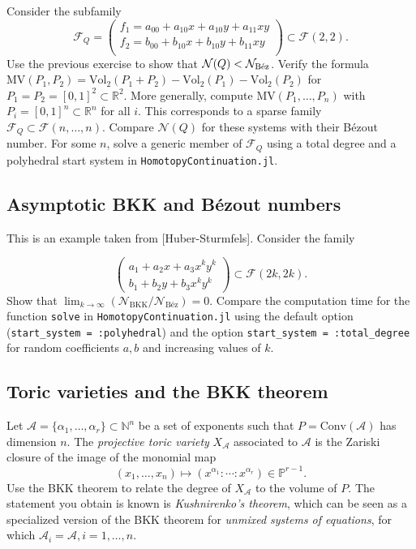 \documentclass[11pt,reqno]{amsart}
\theoremstyle{definition}
\theoremstyle{remark}
\numberwithin{equation}{section}
\begin{document}
Consider the subfamily 
$$ \mathcal{F}_Q = \begin{pmatrix}
f_1 = a_{00} + a_{10}x + a_{10}y + a_{11}xy \\
f_2 = b_{00} + b_{10}x + b_{10}y + b_{11}xy \\
\end{pmatrix} \subset \mathcal{F}(2,2).$$
Use the previous exercise to show that $\mathcal{N}(Q) < \mathcal{N}_{\textup{B\'ez}}$. Verify the formula $\text{MV}(P_1,P_2) = \text{Vol}_2(P_1 + P_2) - \text{Vol}_2(P_1) - \text{Vol}_2(P_2)$ for $P_1 = P_2 = [0,1]^2 \subset \mathbb{R}^2$. More generally, compute $\text{MV}(P_1, \ldots, P_n)$ with $P_i = [0,1]^n \subset \mathbb{R}^n$ for all $i$. This corresponds to a sparse family $\mathcal{F}_Q \subset \mathcal{F}(n,\ldots, n)$. Compare $\mathcal{N}(Q)$ for these systems with their B\'ezout number. For some $n$, solve a generic member of $\mathcal{F}_Q$ using a total degree and a polyhedral start system in \texttt{HomotopyContinuation.jl}.

\subsection{Asymptotic BKK and B\'ezout numbers}
This is an example taken from [Huber-Sturmfels]. Consider the family 

$$\begin{pmatrix}
a_1 +  a_2 x + a_3 x^ky^k \\
b_1 + b_2 y + b_3 x^ky^k 
\end{pmatrix} \subset \mathcal{F}(2k,2k).$$
Show that $\lim_{k \rightarrow \infty} ( \mathcal{N}_{\text{BKK}} / \mathcal{N}_{\text{Béz}} ) = 0$. Compare the computation time for the function \texttt{solve} in \texttt{HomotopyContinuation.jl} using the default option (\texttt{start\_system = :polyhedral}) and the option \texttt{start\_system = :total\_degree} for random coefficients $a, b$ and increasing values of $k$. 

\subsection{Toric varieties and the BKK theorem}

Let $\mathcal{A} = \{ \alpha_1, \ldots, \alpha_r \} \subset \mathbb{N}^n$ be a set of exponents such that $P = \text{Conv}(\mathcal{A})$ has dimension $n$. The \emph{projective toric variety} $X_\mathcal{A}$ associated to $\mathcal{A}$ is the Zariski closure of the image of the monomial map
$$ (x_1, \ldots, x_n) \mapsto (x^{\alpha_1} : \cdots : x^{\alpha_r}) \in \mathbb{P}^{r-1}.$$
Use the BKK theorem to relate the degree of $X_\mathcal{A}$ to the volume of $P$. The statement you obtain is known is \emph{Kushnirenko's theorem}, which can be seen as a specialized version of the BKK theorem for \emph{unmixed systems of equations}, for which $\mathcal{A}_i = \mathcal{A}, i = 1, \ldots, n$.
\end{document}
